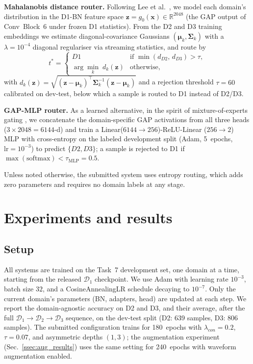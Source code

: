\documentclass[9pt,conference]{IEEEtran}
\begin{document}
\noindent\textbf{Mahalanobis distance router.} Following Lee et al.\
\cite{lee2018mahalanobis}, we model each domain's distribution in the
D1-BN feature space $\mathbf{z}=g_0(\mathbf{x})\in\mathbb{R}^{2048}$ (the
GAP output of Conv~Block~6 under frozen D1 statistics). From the D2 and D3
training embeddings we estimate diagonal-covariance Gaussians
$(\boldsymbol{\mu}_k,\boldsymbol{\Sigma}_k)$ with a $\lambda=10^{-4}$
diagonal regulariser via streaming statistics, and route by
\begin{equation}
  \label{eqn:mahal_routing}
  t^* = \begin{cases}
    D1 & \text{if } \min(d_{D2},\,d_{D3}) > \tau, \\
    \arg\min_k\; d_k(\mathbf{z}) & \text{otherwise,}
  \end{cases}
\end{equation}
with $d_k(\mathbf{z})=\sqrt{(\mathbf{z}-\boldsymbol{\mu}_k)^\top
\boldsymbol{\Sigma}_k^{-1}(\mathbf{z}-\boldsymbol{\mu}_k)}$ and a rejection
threshold $\tau=60$ calibrated on dev-test, below which a sample is routed
to D1 instead of D2/D3.

\noindent\textbf{GAP-MLP router.} As a learned alternative, in the spirit
of mixture-of-experts gating \cite{jacobs1991moe,fedus2022switch}, we
concatenate the domain-specific GAP activations from all three heads
($3\times2048=6144$-d) and train a Linear($6144\!\to\!256$)-ReLU-Linear
($256\!\to\!2$) MLP with cross-entropy on the labeled development split
(Adam, 5~epochs, $\mathrm{lr}=10^{-3}$) to predict $\{D2,D3\}$; a sample is
rejected to D1 if $\max(\mathrm{softmax})<\tau_{\mathrm{MLP}}=0.5$.

Unless noted otherwise, the submitted system uses entropy routing, which
adds zero parameters and requires no domain labels at any stage.


\section{Experiments and results}
\label{sec:results}

\subsection{Setup}
\label{ssec:setup}

All systems are trained on the Task~7 development set, one domain at a
time, starting from the released $\mathcal{D}_1$ checkpoint. We use Adam
with learning rate $10^{-3}$, batch size $32$, and a CosineAnnealingLR
schedule decaying to $10^{-7}$. Only the current domain's parameters (BN,
adapters, head) are updated at each step. We report the domain-agnostic
accuracy on D2 and D3, and their average, after the full
$\mathcal{D}_1\!\rightarrow\!\mathcal{D}_2\!\rightarrow\!\mathcal{D}_3$
sequence, on the dev-test split (D2: 639 samples, D3: 806 samples). The
submitted configuration trains for 180~epochs with $\lambda_{con}=0.2$,
$\tau=0.07$, and asymmetric depths $(1,3)$; the augmentation experiment
(Sec.~\ref{ssec:aug_results}) uses the same setting for 240~epochs with
waveform augmentation enabled.
\end{document}
